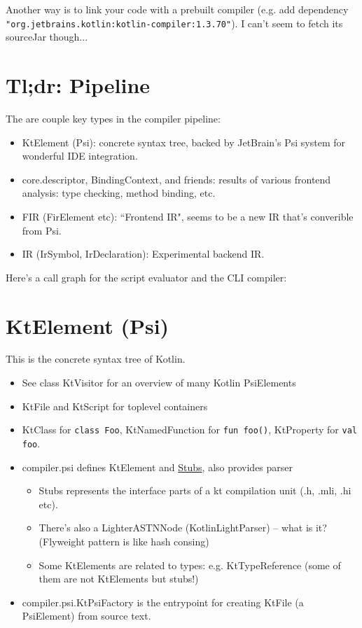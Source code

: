 \documentclass{article}
\begin{document}
Another way is to link your code with a prebuilt compiler (e.g. add dependency \texttt{"org.jetbrains.kotlin:kotlin-compiler:1.3.70"}). I can't seem to fetch its sourceJar though...

\section{Tl;dr: Pipeline}

The are couple key types in the compiler pipeline:

\begin{itemize}
    \item KtElement (Psi): concrete syntax tree, backed by JetBrain's Psi system for wonderful IDE integration.
    \item core.descriptor, BindingContext, and friends: results of various frontend analysis: type checking, method binding, etc.
    \item FIR (FirElement etc): ``Frontend IR", seems to be a new IR that's converible from Psi.
    \item IR (IrSymbol, IrDeclaration): Experimental backend IR.
\end{itemize}

Here's a call graph for the script evaluator and the CLI compiler:
\begin{dot2tex}[dot,scale=0.3]

\end{dot2tex}

\section{KtElement (Psi)}

This is the concrete syntax tree of Kotlin.

\begin{itemize}
    \item See class KtVisitor for an overview of many Kotlin PsiElements
    \item KtFile and KtScript for toplevel containers
    \item KtClass for \texttt{class Foo}, KtNamedFunction for \texttt{fun foo()}, KtProperty for \texttt{val foo}.
    \item compiler.psi defines KtElement and \href{https://www.jetbrains.org/intellij/sdk/docs/basics/indexing_and_psi_stubs/stub_indexes.html}{Stubs}, also provides parser
    \begin{itemize}
        \item Stubs represents the interface parts of a kt compilation unit
        (.h, .mli, .hi etc).
        \item There's also a LighterASTNNode (KotlinLightParser) -- what is it? (Flyweight pattern is like hash consing)
        \item Some KtElements are related to types: e.g. KtTypeReference (some of them are not KtElements but stubs!)
    \end{itemize}
    \item compiler.psi.KtPsiFactory is the entrypoint for creating KtFile (a PsiElement) from source text.
\end{itemize}
\end{document}
